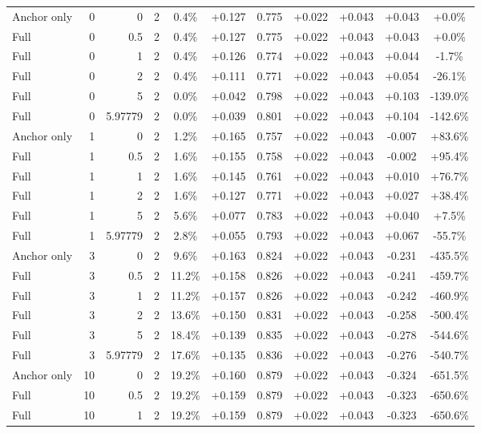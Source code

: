 \begin{table}[htbp]
\begin{tabular}{lrrrccccccc}
Anchor only & 0 & 0 & 2 & 0.4\% & +0.127 & 0.775 & +0.022 & +0.043 & +0.043 & +0.0\% \\
Full & 0 & 0.5 & 2 & 0.4\% & +0.127 & 0.775 & +0.022 & +0.043 & +0.043 & +0.0\% \\
Full & 0 & 1 & 2 & 0.4\% & +0.126 & 0.774 & +0.022 & +0.043 & +0.044 & -1.7\% \\
Full & 0 & 2 & 2 & 0.4\% & +0.111 & 0.771 & +0.022 & +0.043 & +0.054 & -26.1\% \\
Full & 0 & 5 & 2 & 0.0\% & +0.042 & 0.798 & +0.022 & +0.043 & +0.103 & -139.0\% \\
Full & 0 & 5.97779 & 2 & 0.0\% & +0.039 & 0.801 & +0.022 & +0.043 & +0.104 & -142.6\% \\
Anchor only & 1 & 0 & 2 & 1.2\% & +0.165 & 0.757 & +0.022 & +0.043 & -0.007 & +83.6\% \\
Full & 1 & 0.5 & 2 & 1.6\% & +0.155 & 0.758 & +0.022 & +0.043 & -0.002 & +95.4\% \\
Full & 1 & 1 & 2 & 1.6\% & +0.145 & 0.761 & +0.022 & +0.043 & +0.010 & +76.7\% \\
Full & 1 & 2 & 2 & 1.6\% & +0.127 & 0.771 & +0.022 & +0.043 & +0.027 & +38.4\% \\
Full & 1 & 5 & 2 & 5.6\% & +0.077 & 0.783 & +0.022 & +0.043 & +0.040 & +7.5\% \\
Full & 1 & 5.97779 & 2 & 2.8\% & +0.055 & 0.793 & +0.022 & +0.043 & +0.067 & -55.7\% \\
Anchor only & 3 & 0 & 2 & 9.6\% & +0.163 & 0.824 & +0.022 & +0.043 & -0.231 & -435.5\% \\
Full & 3 & 0.5 & 2 & 11.2\% & +0.158 & 0.826 & +0.022 & +0.043 & -0.241 & -459.7\% \\
Full & 3 & 1 & 2 & 11.2\% & +0.157 & 0.826 & +0.022 & +0.043 & -0.242 & -460.9\% \\
Full & 3 & 2 & 2 & 13.6\% & +0.150 & 0.831 & +0.022 & +0.043 & -0.258 & -500.4\% \\
Full & 3 & 5 & 2 & 18.4\% & +0.139 & 0.835 & +0.022 & +0.043 & -0.278 & -544.6\% \\
Full & 3 & 5.97779 & 2 & 17.6\% & +0.135 & 0.836 & +0.022 & +0.043 & -0.276 & -540.7\% \\
Anchor only & 10 & 0 & 2 & 19.2\% & +0.160 & 0.879 & +0.022 & +0.043 & -0.324 & -651.5\% \\
Full & 10 & 0.5 & 2 & 19.2\% & +0.159 & 0.879 & +0.022 & +0.043 & -0.323 & -650.6\% \\
Full & 10 & 1 & 2 & 19.2\% & +0.159 & 0.879 & +0.022 & +0.043 & -0.323 & -650.6\% \\

\end{tabular}
\end{table}
